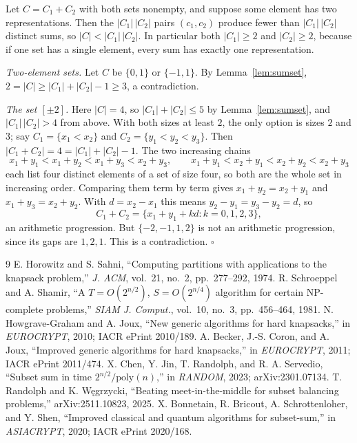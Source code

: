 \documentclass[conference]{IEEEtran}
\begin{document}
Let $C=C_1+C_2$ with both sets nonempty, and suppose some element has two
representations. Then the $|C_1|\,|C_2|$ pairs $(c_1,c_2)$ produce fewer than
$|C_1|\,|C_2|$ distinct sums, so $|C|<|C_1|\,|C_2|$. In particular both
$|C_1|\ge2$ and $|C_2|\ge2$, because if one set has a single element, every sum
has exactly one representation.

\emph{Two-element sets.} Let $C$ be $\{0,1\}$ or $\{-1,1\}$. By
Lemma~\ref{lem:sumset}, $2=|C|\ge|C_1|+|C_2|-1\ge3$, a contradiction.

\emph{The set $[\pm2]$.} Here $|C|=4$, so $|C_1|+|C_2|\le5$ by
Lemma~\ref{lem:sumset}, and $|C_1|\,|C_2|>4$ from above. With both sizes at
least $2$, the only option is sizes $2$ and $3$; say $C_1=\{x_1<x_2\}$ and
$C_2=\{y_1<y_2<y_3\}$. Then $|C_1+C_2|=4=|C_1|+|C_2|-1$. The two increasing
chains
\[
x_1{+}y_1<x_1{+}y_2<x_1{+}y_3<x_2{+}y_3,\qquad
x_1{+}y_1<x_2{+}y_1<x_2{+}y_2<x_2{+}y_3
\]
each list four distinct elements of a set of size four, so both are the whole
set in increasing order. Comparing them term by term gives
$x_1+y_2=x_2+y_1$ and $x_1+y_3=x_2+y_2$. With $d=x_2-x_1$ this means
$y_2-y_1=y_3-y_2=d$, so
\[
C_1+C_2=\{x_1+y_1+kd: k=0,1,2,3\},
\]
an arithmetic progression. But $\{-2,-1,1,2\}$ is not an arithmetic progression,
since its gaps are $1,2,1$. This is a contradiction. \hfill$\square$

\begin{thebibliography}{9}
 E. Horowitz and S. Sahni, ``Computing partitions with applications
to the knapsack problem,'' \emph{J. ACM}, vol.~21, no.~2, pp.~277--292, 1974.
 R. Schroeppel and A. Shamir, ``A $T=O(2^{n/2})$, $S=O(2^{n/4})$
algorithm for certain NP-complete problems,'' \emph{SIAM J. Comput.}, vol.~10,
no.~3, pp.~456--464, 1981.
 N. Howgrave-Graham and A. Joux, ``New generic algorithms for hard
knapsacks,'' in \emph{EUROCRYPT}, 2010; IACR ePrint 2010/189.
 A. Becker, J.-S. Coron, and A. Joux, ``Improved generic algorithms
for hard knapsacks,'' in \emph{EUROCRYPT}, 2011; IACR ePrint 2011/474.
 X. Chen, Y. Jin, T. Randolph, and R. A. Servedio, ``Subset sum
in time $2^{n/2}/\mathrm{poly}(n)$,'' in \emph{RANDOM}, 2023; arXiv:2301.07134.
 T. Randolph and K. W\k{e}grzycki, ``Beating meet-in-the-middle for
subset balancing problems,'' arXiv:2511.10823, 2025.
 X. Bonnetain, R. Bricout, A. Schrottenloher, and Y. Shen,
``Improved classical and quantum algorithms for subset-sum,'' in
\emph{ASIACRYPT}, 2020; IACR ePrint 2020/168.
\end{thebibliography}
\end{document}
